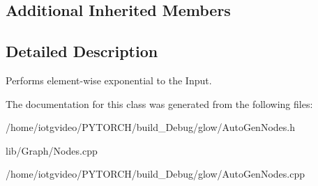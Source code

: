 \subsection*{Additional Inherited Members}


\subsection{Detailed Description}
Performs element-\/wise exponential to the Input. 

The documentation for this class was generated from the following files\+:\begin{DoxyCompactItemize}
\item 
/home/iotgvideo/\+P\+Y\+T\+O\+R\+C\+H/build\+\_\+\+Debug/glow/Auto\+Gen\+Nodes.\+h\item 
lib/\+Graph/Nodes.\+cpp\item 
/home/iotgvideo/\+P\+Y\+T\+O\+R\+C\+H/build\+\_\+\+Debug/glow/Auto\+Gen\+Nodes.\+cpp\end{DoxyCompactItemize}
